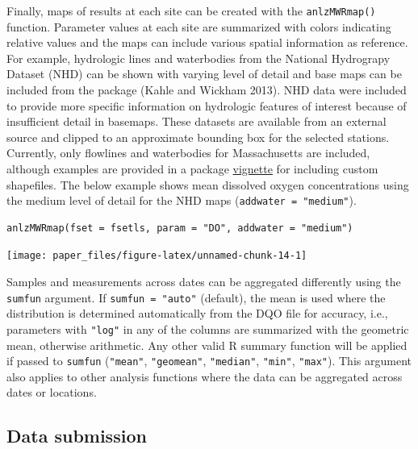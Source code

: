 Finally, maps of results at each site can be created with the \texttt{anlzMWRmap()} function. Parameter values at each site are summarized with colors indicating relative values and the maps can include various spatial information as reference. For example, hydrologic lines and waterbodies from the National Hydrograpy Dataset (NHD) can be shown with varying level of detail and base maps can be included from the  package (Kahle and Wickham 2013). NHD data were included to provide more specific information on hydrologic features of interest because of insufficient detail in basemaps. These datasets are available from an external source and clipped to an approximate bounding box for the selected stations. Currently, only flowlines and waterbodies for Massachusetts are included, although examples are provided in a package \href{https://massbays-tech.github.io/MassWateR/articles/modifying.html\#modifying-masswater-plots}{vignette} for including custom shapefiles. The below example shows mean dissolved oxygen concentrations using the medium level of detail for the NHD maps (\texttt{addwater\ =\ "medium"}).

\begin{verbatim}
anlzMWRmap(fset = fsetls, param = "DO", addwater = "medium")
\end{verbatim}

\begin{center}\texttt{[image: paper\_files/figure-latex/unnamed-chunk-14-1]} \end{center}

Samples and measurements across dates can be aggregated differently using the \texttt{sumfun} argument. If \texttt{sumfun\ =\ "auto"} (default), the mean is used where the distribution is determined automatically from the DQO file for accuracy, i.e., parameters with \texttt{"log"} in any of the columns are summarized with the geometric mean, otherwise arithmetic. Any other valid R summary function will be applied if passed to \texttt{sumfun} (\texttt{"mean"}, \texttt{"geomean"}, \texttt{"median"}, \texttt{"min"}, \texttt{"max"}). This argument also applies to other analysis functions where the data can be aggregated across dates or locations.

\hypertarget{data-submission}{%
\subsection{Data submission}\label{data-submission}}

